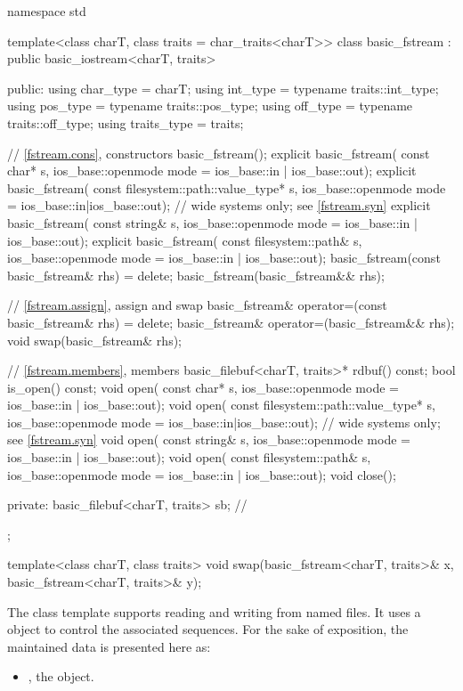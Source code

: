 %
\begin{codeblock}
namespace std {
  template<class charT, class traits = char_traits<charT>>
  class basic_fstream : public basic_iostream<charT, traits> {
  public:
    using char_type   = charT;
    using int_type    = typename traits::int_type;
    using pos_type    = typename traits::pos_type;
    using off_type    = typename traits::off_type;
    using traits_type = traits;

    // \ref{fstream.cons}, constructors
    basic_fstream();
    explicit basic_fstream(
      const char* s,
      ios_base::openmode mode = ios_base::in | ios_base::out);
    explicit basic_fstream(
      const filesystem::path::value_type* s,
      ios_base::openmode mode = ios_base::in|ios_base::out);  // wide systems only; see \ref{fstream.syn}
    explicit basic_fstream(
      const string& s,
      ios_base::openmode mode = ios_base::in | ios_base::out);
    explicit basic_fstream(
      const filesystem::path& s,
      ios_base::openmode mode = ios_base::in | ios_base::out);
    basic_fstream(const basic_fstream& rhs) = delete;
    basic_fstream(basic_fstream&& rhs);

    // \ref{fstream.assign}, assign and swap
    basic_fstream& operator=(const basic_fstream& rhs) = delete;
    basic_fstream& operator=(basic_fstream&& rhs);
    void swap(basic_fstream& rhs);

    // \ref{fstream.members}, members
    basic_filebuf<charT, traits>* rdbuf() const;
    bool is_open() const;
    void open(
      const char* s,
      ios_base::openmode mode = ios_base::in | ios_base::out);
    void open(
      const filesystem::path::value_type* s,
      ios_base::openmode mode = ios_base::in|ios_base::out);  // wide systems only; see \ref{fstream.syn}
    void open(
      const string& s,
      ios_base::openmode mode = ios_base::in | ios_base::out);
    void open(
      const filesystem::path& s,
      ios_base::openmode mode = ios_base::in | ios_base::out);
    void close();

  private:
    basic_filebuf<charT, traits> sb; // \expos
  };

  template<class charT, class traits>
    void swap(basic_fstream<charT, traits>& x,
              basic_fstream<charT, traits>& y);
}
\end{codeblock}

\pnum
The
class template
supports reading and writing from named files.
It uses a
object to control the associated sequences.
For the sake of exposition, the maintained data is presented here as:
\begin{itemize}
\item
{}, the  object.
\end{itemize}


